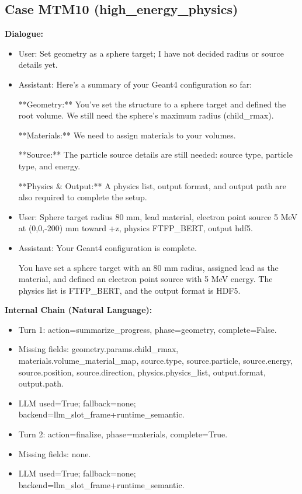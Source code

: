 \documentclass[11pt]{ctexart}
\begin{document}
\subsection{Case MTM10 (high\_energy\_physics)}
\textbf{Dialogue:}
\begin{itemize}
\item User: Set geometry as a sphere target; I have not decided radius or source details yet.
\item Assistant: Here's a summary of your Geant4 configuration so far:

**Geometry:**  
You've set the structure to a sphere target and defined the root volume. We still need the sphere's maximum radius (child\_rmax).

**Materials:**  
We need to assign materials to your volumes.

**Source:**  
The particle source details are still needed: source type, particle type, and energy.

**Physics \& Output:**  
A physics list, output format, and output path are also required to complete the setup.
\item User: Sphere target radius 80 mm, lead material, electron point source 5 MeV at (0,0,-200) mm toward +z, physics FTFP\_BERT, output hdf5.
\item Assistant: Your Geant4 configuration is complete.

You have set a sphere target with an 80 mm radius, assigned lead as the material, and defined an electron point source with 5 MeV energy. The physics list is FTFP\_BERT, and the output format is HDF5.
\end{itemize}
\textbf{Internal Chain (Natural Language):}
\begin{itemize}
\item Turn 1: action=summarize\_progress, phase=geometry, complete=False.
\item Missing fields: geometry.params.child\_rmax, materials.volume\_material\_map, source.type, source.particle, source.energy, source.position, source.direction, physics.physics\_list, output.format, output.path.
\item LLM used=True; fallback=none; backend=llm\_slot\_frame+runtime\_semantic.
\item Turn 2: action=finalize, phase=materials, complete=True.
\item Missing fields: none.
\item LLM used=True; fallback=none; backend=llm\_slot\_frame+runtime\_semantic.
\end{itemize}
\end{document}
